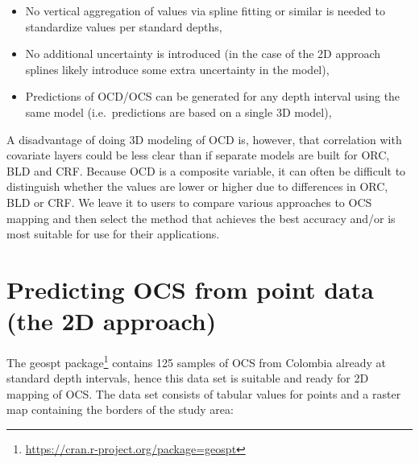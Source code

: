 \documentclass[graybox,natbib,nospthms,UStrade]{svmono}
\newenvironment{Shaded}{\begin{snugshade}}{\end{snugshade}}
\newcommand{\CommentTok}[1]{\textcolor[rgb]{0.37,0.37,0.37}{\textit{#1}}}
\newcommand{\KeywordTok}[1]{\textcolor[rgb]{0.27,0.27,0.27}{\textbf{#1}}}
\newcommand{\NormalTok}[1]{#1}
\newcommand{\StringTok}[1]{\textcolor[rgb]{0.5,0.5,0.5}{#1}}
\renewcommand{\href}[2]{#2 (\url{#1})}
\renewcommand{\href}[2]{#2\footnote{\url{#1}}}
\begin{document}
\begin{itemize}
\item
  No vertical aggregation of values via spline fitting or similar is needed to standardize values per standard depths,
\item
  No additional uncertainty is introduced (in the case of the 2D approach splines likely introduce some extra uncertainty in the model),
\item
  Predictions of OCD/OCS can be generated for any depth interval using the same model (i.e.~predictions are based on a single 3D model),
\end{itemize}

A disadvantage of doing 3D modeling of OCD is, however, that correlation with covariate layers could be less clear than if separate models are built for ORC, BLD and CRF. Because OCD is a composite variable, it can often be difficult to distinguish whether the values are lower or higher due to differences in ORC, BLD or CRF. We leave it to users to compare various approaches to OCS mapping and then select the method that achieves the best accuracy and/or is most suitable for use for their applications.

\hypertarget{predicting-ocs-from-point-data-the-2d-approach}{%
\section{Predicting OCS from point data (the 2D approach)}\label{predicting-ocs-from-point-data-the-2d-approach}}

The \href{https://cran.r-project.org/package=geospt}{geospt package} contains 125 samples of OCS from Colombia already at standard depth intervals, hence this data set is suitable and ready for 2D mapping of OCS. The data set consists of tabular values for points and a raster map containing the borders of the study area:

\begin{Shaded}
\end{Shaded}
\end{document}
